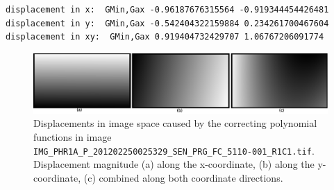 \begin{verbatim}
displacement in x:  GMin,Gax -0.96187676315564 -0.919344454426481
displacement in y:  GMin,Gax -0.542404322159884 0.234261700467604
displacement in xy:  GMin,Gax 0.919404732429707 1.06767206091774
\end{verbatim}
%   
\begin{figure}[h!]
\centering
\includegraphics[width=0.95\linewidth]{FIGS/Satellites/SATD2D.png}
\caption{Displacements in image space caused by the correcting polynomial functions in image \texttt{IMG\_PHR1A\_P\_201202250025329\_SEN\_PRG\_FC\_5110-001\_R1C1.tif}. Displacement magnitude (a) along the x-coordinate, (b) along the y-coordinate, (c) combined along both coordinate directions.}
\label{fig:satPoly2d}
\end{figure}
%
